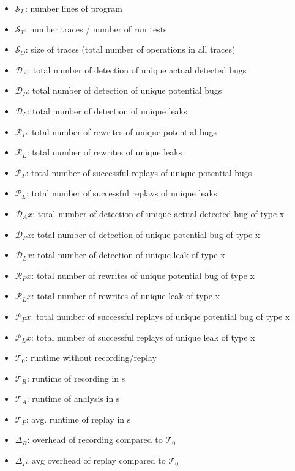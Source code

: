 \documentclass{article}
\begin{document}
\begin{itemize}
\item $\mathcal{S}_L$: number lines of program
\item $\mathcal{S}_T$: number traces / number of run tests
\item $\mathcal{S}_O$: size of traces (total number of operations in all traces)
\item $\mathcal{D}_A$: total number of detection of unique actual detected bugs
\item $\mathcal{D}_P$: total number of detection of unique potential bugs
\item $\mathcal{D}_L$: total number of detection of unique leaks
\item $\mathcal{R}_P$: total number of rewrites of  unique potential bugs
\item $\mathcal{R}_L$: total number of rewrites of  unique leaks
\item $\mathcal{P}_P$: total number of successful replays of unique potential bugs
\item $\mathcal{P}_L$: total number of successful replays of unique leaks
\item $\mathcal{D}_Ax$: total number of detection of unique actual detected bug of type x
\item $\mathcal{D}_Px$: total number of detection of unique potential bug of type x
\item $\mathcal{D}_Lx$: total number of detection of unique leak of type x
\item $\mathcal{R}_Px$: total number of rewrites of  unique potential bug of type x
\item $\mathcal{R}_Lx$: total number of rewrites of  unique leak of type x
\item $\mathcal{P}_Px$: total number of successful replays of unique potential bug of type x
\item $\mathcal{P}_Lx$: total number of successful replays of unique leak of type x
\item $\mathcal{T}_0$: runtime without recording/replay
\item $\mathcal{T}_R$: runtime of recording in s
\item $\mathcal{T}_A$: runtime of analysis in s
\item $\mathcal{T}_P$: avg. runtime of replay in s
\item $\Delta_R$: overhead of recording compared to $\mathcal{T}_0$
\item $\Delta_P$: avg overhead of replay compared to $\mathcal{T}_0$
\end{itemize}
\end{document}
